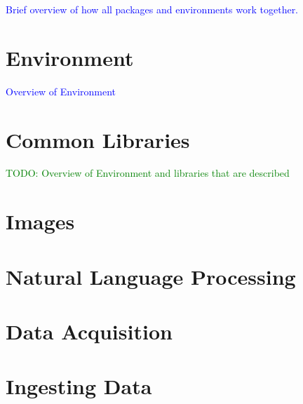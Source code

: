 

\textcolor{blue}{Brief overview of how all packages and environments work together.}

\chapter{Environment}

\textcolor{blue}{Overview of Environment}



















\chapter{Common Libraries}

\textcolor{green}{TODO: Overview of Environment and libraries that are described}





\chapter{Images}



\chapter{Natural Language Processing}




\chapter{Data Acquisition}





\chapter{Ingesting Data}

